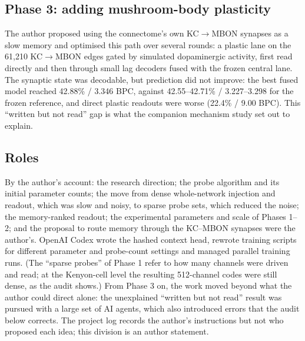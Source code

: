 \documentclass[conference]{IEEEtran}
\begin{document}
\subsection{Phase 3: adding mushroom-body plasticity}
The author proposed using the connectome's own KC$\rightarrow$MBON synapses as
a slow memory and optimised this path over several rounds: a plastic lane on
the 61{,}210 KC$\rightarrow$MBON edges gated by simulated dopaminergic
activity, first read directly and then through small lag decoders fused with
the frozen central lane. The synaptic state was decodable, but prediction did
not improve: the best fused model reached 42.88\% / 3.346 BPC, against
42.55--42.71\% / 3.227--3.298 for the frozen reference, and direct plastic
readouts were worse (22.4\% / 9.00 BPC). This ``written but not read'' gap is
what the companion mechanism study \cite{mechpaper} set out to explain.

\subsection{Roles}
By the author's account: the research direction; the probe algorithm and its
initial parameter counts; the move from dense whole-network injection and
readout, which was slow and noisy, to sparse probe sets, which reduced the
noise; the memory-ranked readout; the experimental parameters and scale of
Phases 1--2; and the proposal to route memory through the KC--MBON synapses
were the author's. OpenAI Codex wrote the hashed context head, rewrote training
scripts for different parameter and probe-count settings and managed parallel
training runs. (The ``sparse probes'' of Phase 1 refer to how many channels
were driven and read; at the Kenyon-cell level the resulting 512-channel codes
were still dense, as the audit shows.) From Phase 3 on, the work moved beyond
what the author could direct alone: the unexplained ``written but not read''
result was pursued with a large set of AI agents, which also introduced errors
that the audit below corrects. The project log records the author's
instructions but not who proposed each idea; this division is an author
statement.

\end{document}
